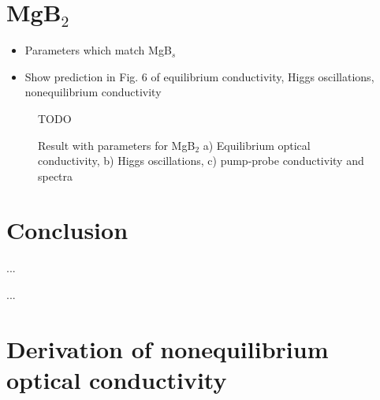 \documentclass[aps,prb,reprint,noeprint,superscriptaddress]{revtex4-1}
\begin{document}
\section{MgB$_2$}
\label{sec:mgb2}

\begin{itemize}
	\item Parameters which match MgB$_s$
	\item Show prediction in Fig. 6 of equilibrium conductivity, Higgs oscillations, nonequilibrium conductivity
\end{itemize}

\begin{figure}[H]
    \centering
    \Huge{TODO}
    \caption{\label{fig:mgb2}%
    Result with parameters for MgB$_2$ a) Equilibrium optical conductivity, b) Higgs oscillations, c) pump-probe conductivity and spectra}
\end{figure}%



\section{Conclusion}
\label{sec:conclusion}

...







\begin{acknowledgments}
...
\end{acknowledgments}











\appendix


\section{Derivation of nonequilibrium optical conductivity}
\label{sec:derivation_noneq_cond}
\end{document}
